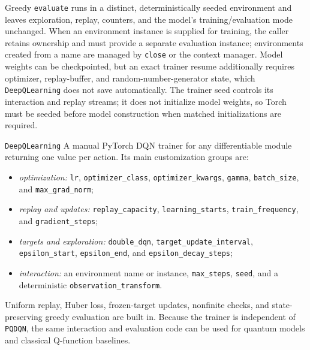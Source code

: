 \documentclass[10pt]{article}
\newcommand{\code}[1]{\texttt{#1}}
\begin{document}
Greedy \code{evaluate} runs in a distinct, deterministically seeded
environment and leaves exploration, replay, counters, and the model's
training/evaluation mode unchanged.  When an environment instance is supplied
for training, the caller retains ownership and must provide a separate
evaluation instance; environments created from a name are managed by
\code{close} or the context manager.  Model weights can be checkpointed, but
an exact trainer resume additionally requires optimizer, replay-buffer, and
random-number-generator state, which \code{DeepQLearning} does not save
automatically.  The trainer seed controls its interaction and replay streams;
it does not initialize model weights, so Torch must be seeded before model
construction when matched initializations are required.

\begin{qaspfeature}{\code{DeepQLearning}}
A manual PyTorch DQN trainer for any differentiable module returning one value
per action.  Its main customization groups are:
\begin{itemize}[leftmargin=1.5em,itemsep=1pt,topsep=3pt]
  \item \emph{optimization:} \code{lr}, \code{optimizer\_class},
        \code{optimizer\_kwargs}, \code{gamma}, \code{batch\_size}, and
        \code{max\_grad\_norm};
  \item \emph{replay and updates:} \code{replay\_capacity},
        \code{learning\_starts}, \code{train\_frequency}, and
        \code{gradient\_steps};
  \item \emph{targets and exploration:} \code{double\_dqn},
        \code{target\_update\_interval}, \code{epsilon\_start},
        \code{epsilon\_end}, and \code{epsilon\_decay\_steps};
  \item \emph{interaction:} an environment name or instance,
        \code{max\_steps}, \code{seed}, and a deterministic
        \code{observation\_transform}.
\end{itemize}
Uniform replay, Huber loss, frozen-target updates, nonfinite checks, and
state-preserving greedy evaluation are built in.  Because the trainer is
independent of \code{PQDQN}, the same interaction and evaluation code can be
used for quantum models and classical Q-function baselines.
\end{qaspfeature}
\end{document}

